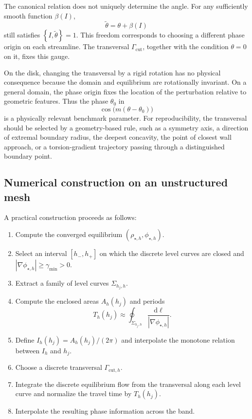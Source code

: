 \documentclass[11pt,a4paper]{article}
\newcommand{\dd}{\,\mathrm{d}}
\newcommand{\bracket}[2]{\left\{#1,#2\right\}}
\newcommand{\abs}[1]{\left|#1\right|}
\begin{document}
The canonical relation does not uniquely determine the angle. For any sufficiently smooth function $\beta(I)$,
\begin{equation}
  \widetilde\theta=\theta+\beta(I)
\end{equation}
still satisfies $\bracket{I}{\widetilde\theta}=1$. This freedom corresponds to choosing a different phase origin on each streamline. The transversal $\Gamma_{\mathrm{cut}}$, together with the condition $\theta=0$ on it, fixes this gauge.

On the disk, changing the transversal by a rigid rotation has no physical consequence because the domain and equilibrium are rotationally invariant. On a general domain, the phase origin fixes the location of the perturbation relative to geometric features. Thus the phase $\theta_0$ in
\begin{equation}
  \cos\bigl(m(\theta-\theta_0)\bigr)
\end{equation}
is a physically relevant benchmark parameter. For reproducibility, the transversal should be selected by a geometry-based rule, such as a symmetry axis, a direction of extremal boundary radius, the deepest concavity, the point of closest wall approach, or a torsion-gradient trajectory passing through a distinguished boundary point.

\subsection{Numerical construction on an unstructured mesh}

A practical construction proceeds as follows:
\begin{enumerate}
  \item Compute the converged equilibrium $(\rho_{\star,h},\phi_{\star,h})$.
  \item Select an interval $[h_-,h_+]$ on which the discrete level curves are closed and $\abs{\nabla\phi_{\star,h}}\geq\gamma_{\min}>0$.
  \item Extract a family of level curves $\Sigma_{h_j,h}$.
  \item Compute the enclosed areas $A_h(h_j)$ and periods
  \begin{equation}
    T_h(h_j)\approx\oint_{\Sigma_{h_j,h}}
    \frac{\dd\ell}{\abs{\nabla\phi_{\star,h}}}.
  \end{equation}
  \item Define $I_h(h_j)=A_h(h_j)/(2\pi)$ and interpolate the monotone relation between $I_h$ and $h_j$.
  \item Choose a discrete transversal $\Gamma_{\mathrm{cut},h}$.
  \item Integrate the discrete equilibrium flow from the transversal along each level curve and normalize the travel time by $T_h(h_j)$.
  \item Interpolate the resulting phase information across the band.
\end{enumerate}
\end{document}
